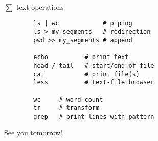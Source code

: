 \documentclass[xcolor=dvipsnames]{beamer}
\begin{document}
\begin{frame}[fragile]
	$\sum$ text operations
	\Large
	\begin{verbatim}
		ls | wc            # piping
		ls > my_segments   # redirection
		pwd >> my_segments # append

		echo          # print text
		head / tail   # start/end of file
		cat           # print file(s)
		less          # text-file browser

		wc     # word count
		tr     # transform
		grep   # print lines with pattern
	\end{verbatim}
\end{frame}

\begin{frame}[fragile]
	\begin{center}
		\Huge
		See you tomorrow!
	\end{center}
\end{frame}
\end{document}
